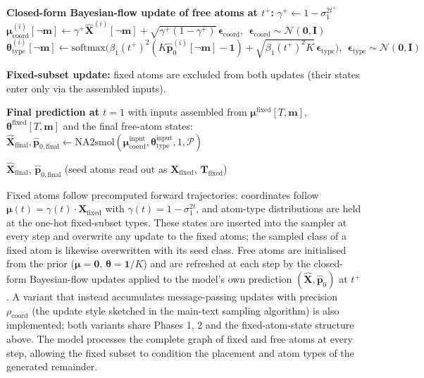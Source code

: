 \begin{algorithm}[H]
\begin{algorithmic}[1]
    \State \textbf{Closed-form Bayesian-flow update of free atoms at $t^{+}$:}
    \State $\gamma^{+} \gets 1 - \sigma_1^{2t^{+}}$
    \State $\boldsymbol{\mu}_{\text{coord}}^{(i)}[\neg \mathbf{m}] \gets \gamma^{+} \hat{\mathbf{X}}^{(i)}[\neg \mathbf{m}] + \sqrt{\gamma^{+}(1-\gamma^{+})}\, \boldsymbol{\epsilon}_{\text{coord}},\ \ \boldsymbol{\epsilon}_{\text{coord}} \sim \mathcal{N}(\mathbf{0}, \mathbf{I})$
    \State $\boldsymbol{\theta}_{\text{type}}^{(i)}[\neg \mathbf{m}] \gets \mathrm{softmax}\bigl(\beta_1 (t^{+})^2 (K \hat{\mathbf{p}}_0^{(i)}[\neg \mathbf{m}] - \mathbf{1}) + \sqrt{\beta_1 (t^{+})^2 K}\, \boldsymbol{\epsilon}_{\text{type}}\bigr),\ \ \boldsymbol{\epsilon}_{\text{type}} \sim \mathcal{N}(\mathbf{0}, \mathbf{I})$

    \State \textbf{Fixed-subset update:} fixed atoms are excluded from both updates (their states enter only via the assembled inputs).
\EndFor

\State \textbf{Final prediction at $t = 1$} with inputs assembled from $\boldsymbol{\mu}^{\text{fixed}}[T, \mathbf{m}]$, $\boldsymbol{\theta}^{\text{fixed}}[T, \mathbf{m}]$ and the final free-atom states:
\State $\hat{\mathbf{X}}_{\text{final}}, \hat{\mathbf{p}}_{0,\text{final}} \gets \text{NA2smol}(\boldsymbol{\mu}_{\text{coord}}^{\text{input}}, \boldsymbol{\theta}_{\text{type}}^{\text{input}}, 1, \mathcal{P})$

\State \Return $\hat{\mathbf{X}}_{\text{final}}$, $\hat{\mathbf{p}}_{0,\text{final}}$ (seed atoms read out as $\mathbf{X}_{\text{fixed}}$, $\mathbf{T}_{\text{fixed}}$)
\end{algorithmic}
\end{algorithm}

Fixed atoms follow precomputed forward trajectories: coordinates follow $\boldsymbol{\mu}(t) = \gamma(t) \cdot \mathbf{X}_{\text{fixed}}$ with $\gamma(t) = 1 - \sigma_1^{2t}$, and atom-type distributions are held at the one-hot fixed-subset types. These states are inserted into the sampler at every step and overwrite any update to the fixed atoms; the sampled class of a fixed atom is likewise overwritten with its seed class. Free atoms are initialised from the prior ($\boldsymbol{\mu} = \mathbf{0}$, $\boldsymbol{\theta} = \mathbf{1}/K$) and are refreshed at each step by the closed-form Bayesian-flow updates applied to the model's own prediction $(\hat{\mathbf{X}}, \hat{\mathbf{p}}_0)$ at $t^{+}$. A variant that instead accumulates message-passing updates with precision $\rho_{\text{coord}}$ (the update style sketched in the main-text sampling algorithm) is also implemented; both variants share Phases 1, 2 and the fixed-atom-state structure above. The model processes the complete graph of fixed and free atoms at every step, allowing the fixed subset to condition the placement and atom types of the generated remainder.

